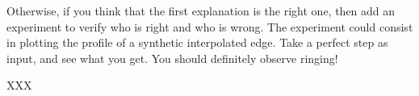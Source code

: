 \documentclass[a4paper,10pt]{report}
\begin{document}
Otherwise, if you think that the first explanation is the right one, then  add an experiment to verify who is right and who is wrong. The experiment could consist in  plotting  the profile of a synthetic interpolated edge. Take a perfect step as input, and see what you get. You should definitely observe ringing!

\ans XXX\\



\end{document}
